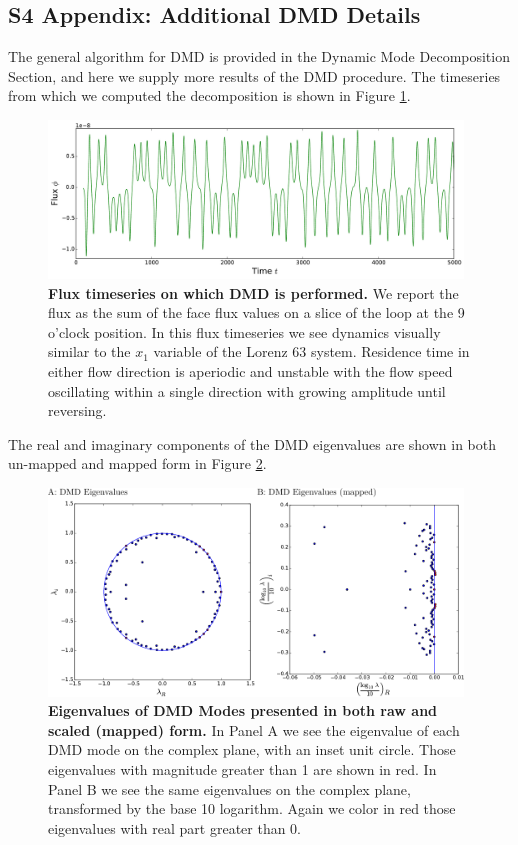 \documentclass[10pt,letterpaper]{article}
\begin{document}
\clearpage
\pagebreak
\subsection*{S4 Appendix: Additional DMD Details}
\label{S4}

The general algorithm for DMD is provided in the Dynamic Mode Decomposition Section, and here we supply more results of the DMD procedure.
The timeseries from which we computed the decomposition is shown in Figure \ref{fig:DMD-timeseries}.

\begin{figure}[h]
  \centering
  \includegraphics[width=0.98\textwidth]{fig17_DMD-data-timeseries-longer-wide.pdf}
  \caption[]{
\textbf{    Flux timeseries on which DMD is performed.
}    We report the flux as the sum of the face flux values on a slice of the loop at the 9 o'clock position.
    In this flux timeseries we see dynamics visually similar to the $x_1$ variable of the Lorenz 63 system.
    Residence time in either flow direction is aperiodic and unstable with the flow speed oscillating within a single direction with growing amplitude until reversing.
  }
  \label{fig:DMD-timeseries}  
\end{figure}

The real and imaginary components of the DMD eigenvalues are shown in both un-mapped and mapped form in Figure \ref{fig:DMD-eigenvalues}.

\begin{figure}[h]
  \centering
  \includegraphics[width=0.98\textwidth]{fig18_eigenvalues-both-labeled.pdf}
  \caption[]{
\textbf{    Eigenvalues of DMD Modes presented in both raw and scaled (mapped) form.
}    In Panel A we see the eigenvalue of each DMD mode on the complex plane, with an inset unit circle.
    Those eigenvalues with magnitude greater than 1 are shown in red.
    In Panel B we see the same eigenvalues on the complex plane, transformed by the base 10 logarithm.
    Again we color in red those eigenvalues with real part greater than 0.
  }
  \label{fig:DMD-eigenvalues}  
\end{figure}
\end{document}
